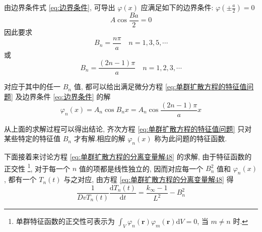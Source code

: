 \documentclass{Sichuan Normal University}
\begin{document}
由边界条件式 \eqref{eq:边界条件}, 可导出 $\varphi(x)$ 应满足如下的边界条件: $\varphi\left( \pm \frac{a}{2}\right)=0$
\begin{equation}
A \cos \frac{B a}{2}=0
\end{equation}
因此要求
\begin{equation}
B_n=\frac{n \pi}{a} \quad n=1,3,5, \cdots
\end{equation}
或
\begin{equation}
B_n=\frac{(2 n-1) \pi}{a} \quad n=1,2,3, \cdots
\label{eq:单群扩散方程的特征值问题410}
\end{equation}

对应于其中的任一 $B_n$ 值, 都可以给出满足微分方程 \eqref{eq:单群扩散方程的特征值问题} 及边界条件 \eqref{eq:边界条件} 的解
\begin{equation}
\varphi_n(x)=A_n \cos B_n x=A_n \cos \frac{(2 n-1) \pi}{a} x
\label{eq:单群扩散方程的特征值问题解的无穷性}
\end{equation}

从上面的求解过程可以得出结论, 齐次方程 \eqref{eq:单群扩散方程的特征值问题} 只对某些特定的特征值 $B_n$ 才有解.相应的解 $\varphi_n(x)$ 称为此问题的特征函数.

下面接着来讨论方程 \eqref{eq:单群扩散方程的分离变量解48} 的求解, 由于特征函数的正交性 \footnote{单群特征函数的正交性可表示为 $\int_V \varphi_n(\boldsymbol{r}) \varphi_m(\boldsymbol{r}) \mathrm{d} V=0$, 当 $m \neq n$ 时.
}, 对于每一个 $n$ 值的项都是线性独立的, 因而对应每一个 $B_n^2$ 值和 $\varphi_n(x)$, 都有一个 $T_n(t)$ 与之对应, 由方程 \eqref{eq:单群扩散方程的分离变量解48} 得
\begin{equation}
\frac{1}{{Dv}T_n(t)} \frac{\mathrm{d} T_n(t)}{\mathrm{d} t}=\frac{k_{\infty}-1}{L^2}-B_n^2
\end{equation}
\end{document}
